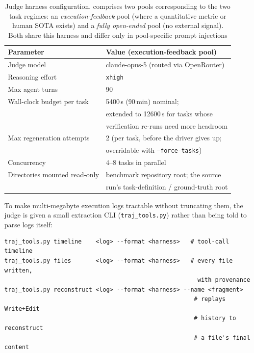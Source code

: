 \begin{table}[h]
\centering
\small
\caption{Judge harness configuration. \bench comprises two pools
corresponding to the two task regimes: an
\emph{execution-feedback} pool (where a quantitative metric or human SOTA
exists) and a \emph{fully open-ended} pool (no external signal). Both share
this harness and differ only in pool-specific prompt injections}
\label{tab:harness-config}
\begin{tabular}{ll}
\toprule
Parameter & Value (execution-feedback pool) \\
\midrule
Judge model & claude-opus-5 (routed via OpenRouter) \\
Reasoning effort & \texttt{xhigh} \\
Max agent turns & 90 \\
Wall-clock budget per task & 5400\,s (90\,min) nominal;\\
 & extended to 12600\,s for tasks whose\\
 & verification re-runs need more headroom \\
Max regeneration attempts & 2 (per task, before the driver gives up;\\
 & overridable with \texttt{--force-tasks}) \\
Concurrency & 4--8 tasks in parallel \\
Directories mounted read-only & benchmark repository root; the source\\
 & run's task-definition / ground-truth root \\
\bottomrule
\end{tabular}

\end{table}

To make multi-megabyte execution logs tractable without truncating them,
the judge is given a small extraction CLI (\texttt{traj\_tools.py}) rather
than being told to parse logs itself:

\begin{verbatim}
traj_tools.py timeline    <log> --format <harness>   # tool-call timeline
traj_tools.py files       <log> --format <harness>   # every file written,
                                                       with provenance
traj_tools.py reconstruct <log> --format <harness> --name <fragment>
                                                      # replays Write+Edit
                                                      # history to reconstruct
                                                      # a file's final content
\end{verbatim}

